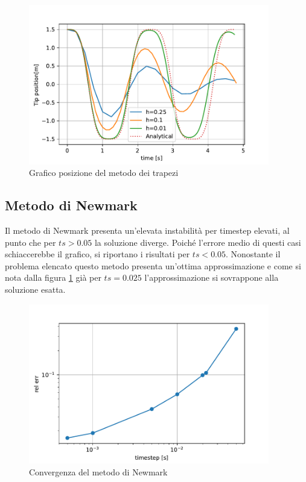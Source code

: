 \begin{figure}[h!]
\centering
\includegraphics[height=7cm]{Figure/Convergenza/Trapz_pos.pdf}
\caption{Grafico posizione del metodo dei trapezi}
 \label{fig:Trapz_pos}
\end{figure}
\FloatBarrier
\subsection{Metodo di Newmark}
Il metodo di Newmark presenta un'elevata instabilità per timestep elevati, al punto che per $ts > 0.05$ la soluzione diverge. Poiché l'errore medio di questi casi schiaccerebbe il grafico, si riportano i risultati per $ts < 0.05$.
Nonostante il problema elencato questo metodo presenta un'ottima approssimazione e come si nota dalla figura \ref{fig:Trapz_pos} già per $ts = 0.025$ l'approssimazione si sovrappone alla soluzione esatta.
\begin{figure}[h!]
\centering
\includegraphics[height=7cm]{Figure/Convergenza/Newm.pdf}
\caption{Convergenza del metodo di Newmark}
 \label{fig:Newm}
\end{figure}

